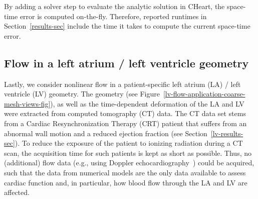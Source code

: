 \documentclass[3p]{elsarticle}
\begin{document}
By adding a solver step to evaluate the analytic solution in CHeart,
the space-time error is computed on-the-fly.
Therefore, reported runtimes in Section~\ref{results-sec}
include the time it takes to compute the current space-time error.
\subsection{Flow in a left atrium / left ventricle geometry}
\label{lv-flow-application-model-problem-sec}
Lastly, we consider nonlinear flow in a patient-specific left atrium (LA) / left ventricle (LV) geometry.
The geometry (see Figure~\ref{lv-flow-application-coarse-mesh-views-fig}),
as well as the time-dependent deformation of the LA and LV were extracted
from computed tomography (CT) data.
The CT data set stems from a Cardiac Resynchronization Therapy (CRT) patient
that suffers from an abnormal wall motion and a reduced ejection fraction (see Section~\ref{lv-results-sec}).
To reduce the exposure of the patient to ionizing radiation during a CT scan,
the acquisition time for such patients is kept as short as possible.
Thus, no (additional) flow data
(e.g., using Doppler echocardiography~\cite{NishimuraMillerjrCallahanBenassiSewardTajik1985})
could be acquired, such that the data from numerical models are the only data available to assess cardiac function
and, in particular, how blood flow through the LA and LV are affected.
\end{document}
